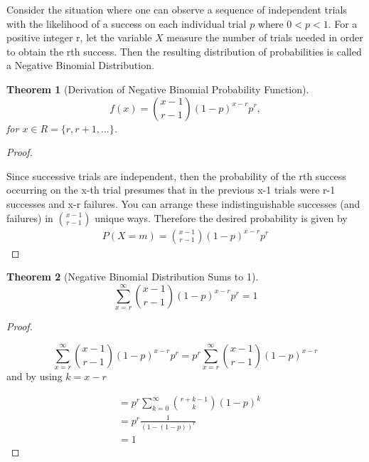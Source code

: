 \documentclass[10pt,]{book}
\theoremstyle{plain}
\newtheorem{theorem}{Theorem}[section]
\theoremstyle{definition}
\theoremstyle{definition}
\theoremstyle{definition}
\numberwithin{equation}{section}
\newcommand{\lt}{ < }
\begin{document}
\par
Consider the situation where one can observe a sequence  of independent trials with the likelihood of a success on each individual trial \(p\) where 
	\( 0 \lt p \lt 1 \).  
	For a positive integer r, let the variable \(X\) measure the number of trials needed in order to obtain the rth success. Then the resulting distribution of probabilities is called a Negative Binomial Distribution.%
\begin{theorem}[{Derivation of Negative Binomial Probability Function}]\label{theorem-48}
\begin{equation*}f(x) = \binom{x - 1}{r-1}(1-p)^{x-r}p^r,\end{equation*}
	for \(x \in R = \{r, r+1, ... \}\).
	\end{theorem}
\begin{proof}\hypertarget{proof-44}{}
 Since successive trials are independent, then the probability of the rth success occurring on the x-th trial presumes that in the previous x-1 trials were r-1 successes and x-r failures. You can arrange these indistinguishable successes (and failures) in \(\binom{x-1}{r-1}\) unique ways. Therefore the desired probability is given by 
			\begin{gather*}
P(X=m) = \binom{x - 1}{r-1}(1-p)^{x-r}p^r
\end{gather*}
\end{proof}
\begin{theorem}[{Negative Binomial Distribution Sums to 1}]\label{theorem-49}
\begin{equation*}\sum_{x=r}^{\infty} {\binom{x - 1}{r-1}(1-p)^{x-r}p^r} = 1\end{equation*}\end{theorem}
\begin{proof}\hypertarget{proof-45}{}

		\begin{equation*}\sum_{x=r}^{\infty} {\binom{x - 1}{r-1}(1-p)^{x-r}p^r} = p^r \sum_{x=r}^{\infty} {\binom{x - 1}{r-1}(1-p)^{x-r}}\end{equation*}
		and by using \(k = x-r\)%

		\begin{align*}
 & = p^r \sum_{k=0}^{\infty} {\binom{r + k - 1}{k}(1-p)^k}\\
 & = p^r \frac{1}{(1-(1-p))^r}\\
 & = 1
\end{align*}
\end{proof}
\end{document}
